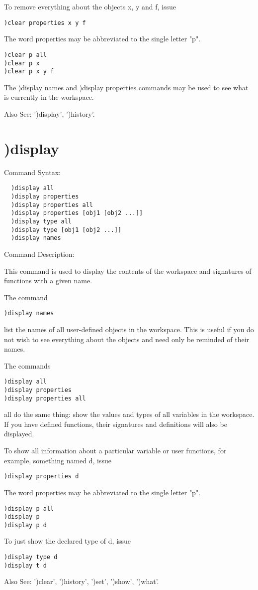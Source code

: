 To remove everything about the objects x, y and f, issue
\begin{verbatim}
)clear properties x y f
\end{verbatim}
The word properties may be abbreviated to the single letter "p".
\begin{verbatim}
)clear p all
)clear p x
)clear p x y f
\end{verbatim}

The )display names and )display properties commands may be used to see what is currently in the workspace.

Also See: ')display', ')history'.

\section{)display}

Command Syntax:
\begin{verbatim}
  )display all
  )display properties
  )display properties all
  )display properties [obj1 [obj2 ...]]
  )display type all
  )display type [obj1 [obj2 ...]]
  )display names
\end{verbatim}
Command Description:

This command is used to display the contents of the workspace and signatures of functions with a given name.

The command
\begin{verbatim}
)display names
\end{verbatim}
list the names of all user-defined objects in the workspace. This is useful if you do not wish to see everything about the objects and need only be reminded of their names.

The commands
\begin{verbatim}
)display all
)display properties
)display properties all
\end{verbatim}
all do the same thing: show the values and types of all variables in the workspace. If you have defined functions, their signatures and definitions will also be displayed.

To show all information about a particular variable or user functions, for example, something named d, issue
\begin{verbatim}
)display properties d
\end{verbatim}
The word properties may be abbreviated to the single letter "p".
\begin{verbatim}
)display p all
)display p
)display p d
\end{verbatim}
To just show the declared type of d, issue
\begin{verbatim}
)display type d
)display t d
\end{verbatim}
Also See: ')clear', ')history', ')set', ')show', ')what'.


